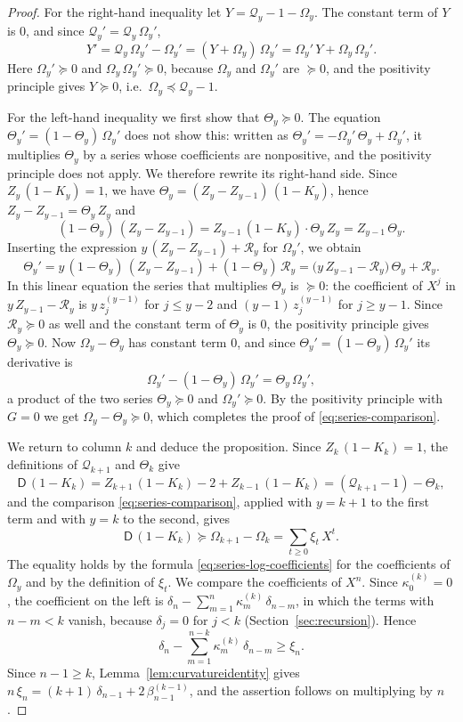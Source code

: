 \documentclass{amsart}
\theoremstyle{definition}
\theoremstyle{remark}
\numberwithin{equation}{section}
\begin{document}
\begin{proof}
For the right-hand inequality let $Y=\mathcal{Q}_y-1-\Omega_y$. The constant term of $Y$ is $0$, and since $\mathcal{Q}_y'=\mathcal{Q}_y\,\Omega_y'$,
\[
Y'=\mathcal{Q}_y\,\Omega_y'-\Omega_y'=(Y+\Omega_y)\,\Omega_y'=\Omega_y'\,Y+\Omega_y\,\Omega_y' .
\]
Here $\Omega_y'\succeq 0$ and $\Omega_y\,\Omega_y'\succeq 0$, because $\Omega_y$ and $\Omega_y'$ are $\succeq 0$, and the positivity principle gives $Y\succeq 0$, i.e.\ $\Omega_y\preceq\mathcal{Q}_y-1$.

For the left-hand inequality we first show that $\Theta_y\succeq 0$. The equation $\Theta_y'=(1-\Theta_y)\,\Omega_y'$ does not show this: written as $\Theta_y'=-\Omega_y'\,\Theta_y+\Omega_y'$, it multiplies $\Theta_y$ by a series whose coefficients are nonpositive, and the positivity principle does not apply. We therefore rewrite its right-hand side. Since $Z_y\,(1-K_y)=1$, we have $\Theta_y=(Z_y-Z_{y-1})\,(1-K_y)$, hence $Z_y-Z_{y-1}=\Theta_y\,Z_y$ and
\[
(1-\Theta_y)\,(Z_y-Z_{y-1})=Z_{y-1}\,(1-K_y)\cdot\Theta_y\,Z_y=Z_{y-1}\,\Theta_y .
\]
Inserting the expression $y\,(Z_y-Z_{y-1})+\mathcal{R}_y$ for $\Omega_y'$, we obtain
\[
\Theta_y'=y\,(1-\Theta_y)\,(Z_y-Z_{y-1})+(1-\Theta_y)\,\mathcal{R}_y=\bigl(y\,Z_{y-1}-\mathcal{R}_y\bigr)\,\Theta_y+\mathcal{R}_y .
\]
In this linear equation the series that multiplies $\Theta_y$ is $\succeq 0$: the coefficient of $X^j$ in $y\,Z_{y-1}-\mathcal{R}_y$ is $y\,z^{(y-1)}_j$ for $j\le y-2$ and $(y-1)\,z^{(y-1)}_j$ for $j\ge y-1$. Since $\mathcal{R}_y\succeq 0$ as well and the constant term of $\Theta_y$ is $0$, the positivity principle gives $\Theta_y\succeq 0$. Now $\Omega_y-\Theta_y$ has constant term $0$, and since $\Theta_y'=(1-\Theta_y)\,\Omega_y'$ its derivative is
\[
\Omega_y'-(1-\Theta_y)\,\Omega_y'=\Theta_y\,\Omega_y' ,
\]
a product of the two series $\Theta_y\succeq 0$ and $\Omega_y'\succeq 0$. By the positivity principle with $G=0$ we get $\Omega_y-\Theta_y\succeq 0$, which completes the proof of \eqref{eq:series-comparison}.

We return to column $k$ and deduce the proposition. Since $Z_k\,(1-K_k)=1$, the definitions of $\mathcal{Q}_{k+1}$ and $\Theta_k$ give
\[
\mathsf{D}\,(1-K_k)=Z_{k+1}\,(1-K_k)-2+Z_{k-1}\,(1-K_k)=(\mathcal{Q}_{k+1}-1)-\Theta_k ,
\]
and the comparison \eqref{eq:series-comparison}, applied with $y=k+1$ to the first term and with $y=k$ to the second, gives
\begin{equation}\label{eq:series-column}
\mathsf{D}\,(1-K_k)\succeq \Omega_{k+1}-\Omega_k=\sum_{t\ge 0}\xi_t\,X^t .
\end{equation}
The equality holds by the formula \eqref{eq:series-log-coefficients} for the coefficients of $\Omega_y$ and by the definition of $\xi_t$. We compare the coefficients of $X^n$. Since $\kappa^{(k)}_0=0$, the coefficient on the left is $\delta_n-\sum_{m=1}^{n}\kappa^{(k)}_m\,\delta_{n-m}$, in which the terms with $n-m<k$ vanish, because $\delta_j=0$ for $j<k$ (Section~\ref{sec:recursion}). Hence
\[
\delta_n-\sum_{m=1}^{n-k}\kappa^{(k)}_m\,\delta_{n-m}\ge\xi_n .
\]
Since $n-1\ge k$, Lemma~\ref{lem:curvatureidentity} gives $n\,\xi_n=(k+1)\,\delta_{n-1}+2\,\beta^{(k-1)}_{n-1}$, and the assertion follows on multiplying by $n$.
\end{proof}
\end{document}
